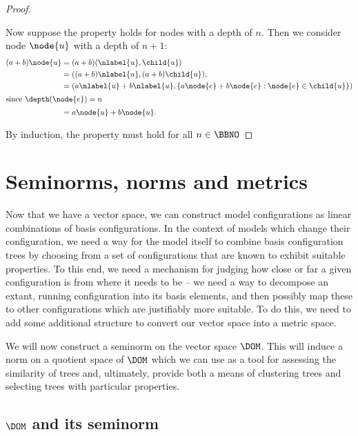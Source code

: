 \begin{proposition}
\begin{proof}
\begin{description}
      Now suppose the property holds for nodes with a depth of $n$.
      Then we consider node $\node{u}$ with a depth of $n+1$:
      \begin{align*}
        (a + b)\node{u} &= (a + b) (\nlabel{u}, \child{u}) \\
        &= ((a + b)\nlabel{u}, (a + b)\child{u}), \\
        &= (a\nlabel{u} + b\nlabel{u}, \{a \node{e} + b \node{e}:\node{e}\in\child{u}\}) \\
        \intertext{since $\depth(\node{e}) = n$}
        &= a \node{u} + b \node{u}.
      \end{align*}

    \end{description}
    By induction, the property must hold for all $n \in\BBNO$
  \end{proof}
\end{proposition}

\section{Seminorms, norms and metrics} %

Now that we have a vector space, we can construct model configurations
as linear combinations of basis configurations. In the context of
models which change their configuration, we need a way for the model
itself to combine basis configuration trees by choosing from a set of
configurations that are known to exhibit suitable properties.  To this
end, we need a mechanism for judging how close or far a given
configuration is from where it needs to be -- we need a way to
decompose an extant, running configuration into its basis elements,
and then possibly map these to other configurations which are
justifiably more suitable.  To do this, we need to add some additional
structure to convert our vector space into a metric space.

We will now construct a seminorm on the vector space
$\DOM$. This will induce a norm on a quotient space of $\DOM$ which we
can use as a tool for assessing the similarity of trees and,
ultimately, provide both a means of clustering trees and selecting
trees with particular properties.

\subsection{$\DOM$ and its seminorm}

